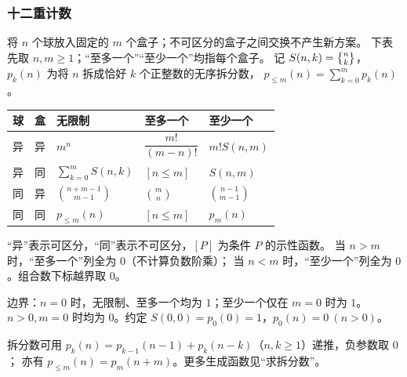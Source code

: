 \begin{footnotesize}
\subsubsection{十二重计数}
将 $n$ 个球放入固定的 $m$ 个盒子；不可区分的盒子之间交换不产生新方案。
下表先取 $n,m\ge1$；“至多一个”“至少一个”均指每个盒子。
记 $S(n,k)=\stirlingtwo{n}{k}$，$p_k(n)$ 为将 $n$ 拆成恰好 $k$ 个正整数的无序拆分数，
$p_{\le m}(n)=\sum_{k=0}^{m}p_k(n)$。
\par\smallskip
\begingroup
\renewcommand{\arraystretch}{1.8}
\setlength{\tabcolsep}{2pt}
\noindent\begin{tabularx}{\linewidth}{|c|c|>{\centering\arraybackslash}X|>{\centering\arraybackslash}X|>{\centering\arraybackslash}X|}
\hline
球 & 盒 & 无限制 & 至多一个 & 至少一个 \\
\hline
异 & 异 & $m^n$ & $\dfrac{m!}{(m-n)!}$ & $m!S(n,m)$ \\
\hline
异 & 同 & $\sum_{k=0}^{m}S(n,k)$ & $[n\le m]$ & $S(n,m)$ \\
\hline
同 & 异 & $\binom{n+m-1}{m-1}$ & $\binom{m}{n}$ & $\binom{n-1}{m-1}$ \\
\hline
同 & 同 & $p_{\le m}(n)$ & $[n\le m]$ & $p_m(n)$ \\
\hline
\end{tabularx}
\endgroup
\par “异”表示可区分，“同”表示不可区分，$[P]$ 为条件 $P$ 的示性函数。
当 $n>m$ 时，“至多一个”列全为 $0$（不计算负数阶乘）；
当 $n<m$ 时，“至少一个”列全为 $0$。组合数下标越界取 $0$。
\par 边界：$n=0$ 时，无限制、至多一个均为 $1$；至少一个仅在 $m=0$ 时为 $1$。
$n>0,m=0$ 时均为 $0$。约定 $S(0,0)=p_0(0)=1$，$p_0(n)=0\ (n>0)$。
\par 拆分数可用 $p_k(n)=p_{k-1}(n-1)+p_k(n-k)$（$n,k\ge1$）递推，负参数取 $0$；
亦有 $p_{\le m}(n)=p_m(n+m)$。更多生成函数见“求拆分数”。


\end{footnotesize}
